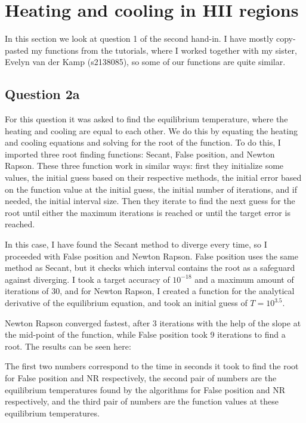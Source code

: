 \section{Heating and cooling in HII regions}

In this section we look at question 1 of the second hand-in. 
I have mostly copy-pasted my functions from the tutorials, where I worked together with my sister,
Evelyn van der Kamp (s2138085), so some of our functions are quite similar.



\subsection{Question 2a}

For this question it was asked to find the equilibrium temperature, where the heating and cooling are equal to each other.
We do this by equating the heating and cooling equations and solving for the root of the function.
To do this, I imported three root finding functions: Secant, False position, and Newton Rapson.
These three function work in similar ways: first they initialize some values, the initial guess based on their respective methods, the initial error based on the function value at the initial guess, the initial number of iterations, and if needed, the initial interval size.
Then they iterate to find the next guess for the root until either the maximum iterations is reached or until the target error is reached. 

In this case, I have found the Secant method to diverge every time, so I proceeded with False position and Newton Rapson. 
False position uses the same method as Secant, but it checks which interval contains the root as a safeguard against diverging. 
I took a target accuracy of $10^{-18}$ and a maximum amount of iterations of 30, and for Newton Rapson, I created a function for the analytical derivative of the equilibrium equation, and took an initial guess of $T = 10^{3.5}$.

Newton Rapson converged fastest, after 3 iterations with the help of the slope at the mid-point of the function, while False position took 9 iterations to find a root. 
The results can be seen here:



The first two numbers correspond to the time in seconds it took to find the root for False position and NR respectively, the second pair of numbers are the equilibrium temperatures found by the algorithms for False position and NR respectively, and the third pair of numbers are the function values at these equilibrium temperatures.

